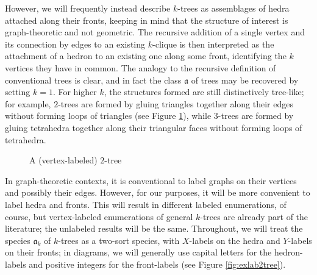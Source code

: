 \documentclass[sectionflow,singlespace,twoside]{brandiss} %
\numberwithin{section}{chapter}
\numberwithin{figure}{chapter}
\begin{document}
However, we will frequently instead describe $k$-trees as assemblages of hedra attached along their fronts, keeping in mind that the structure of interest is graph-theoretic and not geometric.
The recursive addition of a single vertex and its connection by edges to an existing $k$-clique is then interpreted as the attachment of a hedron to an existing one along some front, identifying the $k$ vertices they have in common.
The analogy to the recursive definition of conventional trees is clear, and in fact the class $\mathfrak{a}$ of trees may be recovered by setting $k = 1$.
For higher $k$, the structures formed are still distinctively tree-like; for example, $2$-trees are formed by gluing triangles together along their edges without forming loops of triangles (see Figure \ref{fig:ex2tree}), while $3$-trees are formed by gluing tetrahedra together along their triangular faces without forming loops of tetrahedra.

\begin{figure}[htb]
  \centering
  \caption{A (vertex-labeled) $2$-tree}
  \label{fig:ex2tree}
\end{figure}

In graph-theoretic contexts, it is conventional to label graphs on their vertices and possibly their edges.
However, for our purposes, it will be more convenient to label hedra and fronts.
This will result in different labeled enumerations, of course, but vertex-labeled enumerations of general $k$-trees are already part of the literature; the unlabeled results will be the same.
Throughout, we will treat the species $\mathfrak{a}_{k}$ of $k$-trees as a two-sort species, with $X$-labels on the hedra and $Y$-labels on their fronts; in diagrams, we will generally use capital letters for the hedron-labels and positive integers for the front-labels (see Figure \ref{fig:exlab2tree}).
\end{document}

